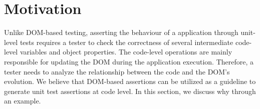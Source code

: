 \section{Motivation} \label{Sec:motivation}

Unlike DOM-based testing, asserting the behaviour of a \javascript application through unit-level tests requires a tester to check the correctness of several intermediate code-level variables and object properties. The code-level operations are mainly responsible for updating the DOM during the application execution. Therefore, a tester needs to analyze the relationship between the \javascript code and the DOM's evolution. 
We believe that DOM-based assertions can be utilized as a guideline to generate unit test assertions at \javascript code level. In this section, we discuss why through an example.


